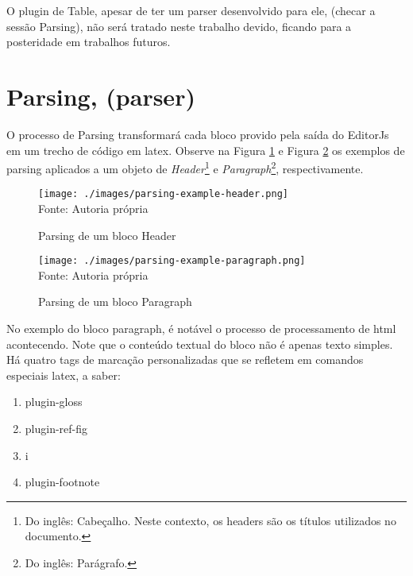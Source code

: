 O plugin de Table, apesar de ter um parser desenvolvido para ele,
(checar a sessão Parsing), não será tratado neste trabalho devido,
ficando para a posteridade em trabalhos futuros.

\section{Parsing, (parser)}

O processo de Parsing transformará cada bloco provido
pela saída do EditorJs em um trecho de código em
\acrshort{latex}.
Observe na
Figura \ref{fig:parsing-example-header}
e
Figura \ref{fig:parsing-example-paragraph}
os exemplos de parsing aplicados a um objeto de
\textit{Header}\footnote{Do inglês: Cabeçalho. Neste contexto, os headers são os títulos utilizados no documento.
}
e
\textit{Paragraph}\footnote{Do inglês: Parágrafo.
},
respectivamente.

\begin{figure}[H]
    \centering
    \caption{Parsing de um bloco Header}
    \texttt{[image: ./images/parsing-example-header.png]}
    \label{fig:parsing-example-header} \\
    \textnormal{\fontsize{10pt}{12pt}Fonte: Autoria própria}
\end{figure}

\begin{figure}[H]
    \centering
    \caption{Parsing de um bloco Paragraph}
    \texttt{[image: ./images/parsing-example-paragraph.png]}
    \label{fig:parsing-example-paragraph} \\
    \textnormal{\fontsize{10pt}{12pt}Fonte: Autoria própria}
\end{figure}

No exemplo do bloco paragraph, é notável o processo de
processamento de
\acrshort{html}
acontecendo. Note que o conteúdo textual do bloco
não é apenas texto simples. Há quatro tags de
marcação personalizadas que se refletem em comandos
especiais
\acrshort{latex}, a saber:

\begin{enumerate}
        
	\item plugin-gloss
	\item plugin-ref-fig
	\item i
	\item plugin-footnote
    
\end{enumerate}

